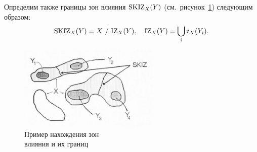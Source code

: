 \documentclass[14pt, a4paper]{extreport}
\begin{document}
	Определим также границы зон влияния $\textup{SKIZ}_X(Y)$ (см.~рисунок~\ref{fig:SKIZ}) следующим образом:\vspace*{-0.3cm}
	\begin{equation*}
		\textup{SKIZ}_X(Y) = X~/~\textup{IZ}_X(Y),~~~\textup{IZ}_X(Y) = \bigcup_{i} \textup{z}_X(Y_i).
		\vspace*{-0.3cm}
		\label{SKIZ_X(Y)}
	\end{equation*}
	
	\begin{figure}[h!]
		\centering
		\includegraphics[width = 0.6\textwidth]{image/chapter_2/SKIZ}	
		\caption{Пример нахождения зон \\влияния и их границ}
		\vspace*{0.4cm}
		\label{fig:SKIZ}
	\end{figure}
	
\end{document}
